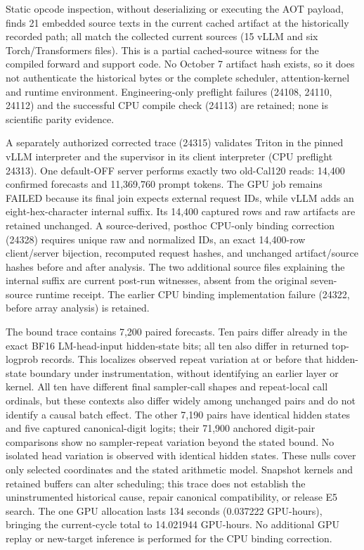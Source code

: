Static opcode inspection, without deserializing or executing the AOT payload,
finds 21 embedded source texts in the current cached artifact at the
historically recorded path; all match the collected current sources
(15 vLLM and six Torch/Transformers files). This is a partial cached-source
witness for the compiled forward and support code. No October 7 artifact
hash exists, so it does not authenticate the historical bytes or the complete
scheduler, attention-kernel and runtime environment. Engineering-only
preflight failures (24108, 24110, 24112) and the successful CPU compile
check (24113) are retained; none is scientific parity evidence.


A separately authorized corrected trace (24315) validates Triton in the
pinned vLLM interpreter and the supervisor in its client interpreter
(CPU preflight 24313). One default-OFF server performs exactly two old-Cal120
reads: 14,400 confirmed forecasts and 11,369,760 prompt tokens. The GPU job
remains FAILED because its final join expects external request IDs, while
vLLM adds an eight-hex-character internal suffix. Its 14,400 captured rows
and raw artifacts are retained unchanged. A source-derived, posthoc CPU-only
binding correction (24328) requires unique raw and normalized IDs, an exact
14,400-row client/server bijection, recomputed request hashes, and unchanged
artifact/source hashes before and after analysis. The two additional source
files explaining the internal suffix are current post-run witnesses, absent
from the original seven-source runtime receipt. The earlier CPU binding
implementation failure (24322, before array analysis) is retained.

The bound trace contains 7,200 paired forecasts. Ten pairs differ already
in the exact BF16 LM-head-input hidden-state bits; all ten also differ
in returned top-logprob records. This localizes observed repeat
variation at or before that hidden-state boundary under instrumentation,
without identifying an earlier layer or kernel. All ten have different final
sampler-call shapes and repeat-local call ordinals, but these contexts also
differ widely among unchanged pairs and do not identify a causal batch effect.
The other 7,190 pairs have
identical hidden states and five captured canonical-digit logits; their
71,900 anchored digit-pair comparisons show no sampler-repeat variation
beyond the stated bound. No isolated head variation is observed with
identical hidden states. These nulls cover only selected coordinates and
the stated arithmetic model. Snapshot kernels and retained buffers can
alter scheduling; this trace does not establish the uninstrumented
historical cause, repair canonical compatibility, or release E5 search.
The one GPU allocation lasts 134 seconds (0.037222 GPU-hours), bringing
the current-cycle total to 14.021944 GPU-hours. No additional GPU replay or
new-target inference is performed for the CPU binding correction.


